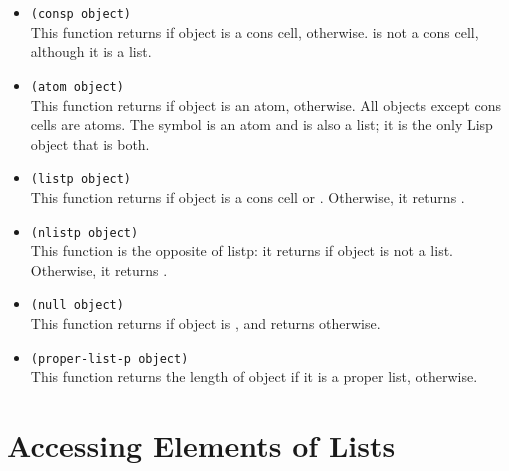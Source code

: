 \begin{itemize}
\item \lstinline|(consp object)|\\
  This function returns  if object is a cons cell,  otherwise.
   is not a cons cell, although it is a list.
\item \lstinline|(atom object)|\\
  This function returns  if object is an atom,  otherwise.
  All objects except cons cells are atoms.
  The symbol  is an atom and is also a list; it is the only Lisp object that is both.
\item \lstinline|(listp object)|\\
  This function returns  if object is a cons cell or .
  Otherwise, it returns .
\item \lstinline|(nlistp object)|\\
  This function is the opposite of listp: it returns  if object is not a list.
  Otherwise, it returns .
\item \lstinline|(null object)|\\
  This function returns  if object is , and returns  otherwise.
\item \lstinline|(proper-list-p object)|\\
  This function returns the length of object if it is a proper list,  otherwise.
\end{itemize}


\section{Accessing Elements of Lists}
\label{sec:access-elem-lists}

